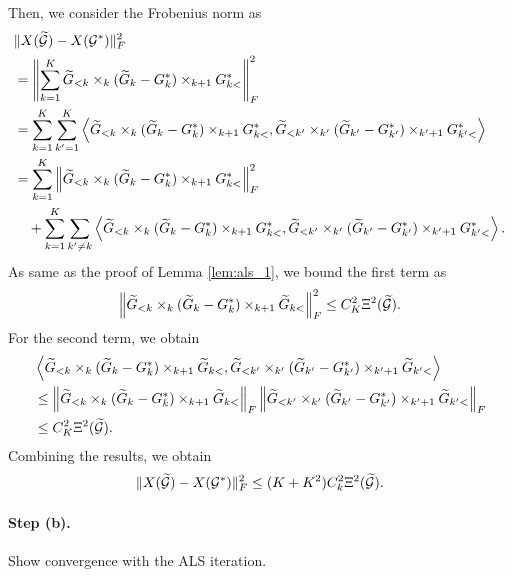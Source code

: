 Then, we consider the Frobenius norm as
\begin{align*}
	&\|X(\widetilde{\mathcal{G}}) - X(\mathcal{G}^*)\|_F^2 \\
	&= \left\| \sum_{k=1}^{K}  \widetilde G_{<k} \times_{k} (\widetilde G_{k} -  G_{k}^*) \times_{k+1}   G_{k<}^* \right\|_F^2 \\
	&= \sum_{k=1}^{K} \sum_{k'=1}^{K} \left\langle  \widetilde G_{<k} \times_{k} (\widetilde G_{k} -  G_{k}^*) \times_{k+1}   G_{k<}^*,  \widetilde G_{<k'} \times_{k'} (\widetilde G_{k'} -  G_{k'}^*) \times_{k'+1}   G_{k'<}^* \right\rangle \\
	&= \sum_{k=1}^K  \left\|   \widetilde G_{<k} \times_{k} (\widetilde G_{k} -  G_{k}^*) \times_{k+1}   G_{k<}^* \right\|_F^2 \\
	&\quad + \sum_{k=1}^{K} \sum_{k'\neq k} \left\langle  \widetilde G_{<k} \times_{k} (\widetilde G_{k} -  G_{k}^*) \times_{k+1}   G_{k<}^*,  \widetilde G_{<k'} \times_{k'} (\widetilde G_{k'} -  G_{k'}^*) \times_{k'+1}   G_{k'<}^* \right\rangle.
\end{align*}
As same as the proof of Lemma \ref{lem:als_1}, we bound the first term as
\begin{align*}
	\left\|   \widetilde G_{<k} \times_{k} (\widetilde G_{k} -  G_{k}^*) \times_{k+1}  \widetilde G_{k<} \right\|_F^2 \leq C_K^2\Xi^2(\widetilde{\mathcal{G}}).
\end{align*}
For the second term, we obtain
\begin{align*}
	&\left \langle  \widetilde G_{<k} \times_{k} (\widetilde G_{k} -  G_{k}^*) \times_{k+1}  \widetilde G_{k<},  \widetilde G_{<k'} \times_{k'} (\widetilde G_{k'} -  G_{k'}^*) \times_{k'+1}  \widetilde G_{k'<} \right\rangle \\
	&\leq \left\| \widetilde G_{<k} \times_{k} (\widetilde G_{k} -  G_{k}^*) \times_{k+1}  \widetilde G_{k<}\right\|_F \left\| \widetilde G_{<k'} \times_{k'} (\widetilde G_{k'} -  G_{k'}^*) \times_{k'+1}  \widetilde G_{k'<} \right\|_F \\
	&\leq  C_K^2\Xi^2(\widetilde{\mathcal{G}}).
\end{align*}
Combining the results, we obtain 
\begin{align*}
	\|X(\widetilde{\mathcal{G}}) - X(\mathcal{G}^*)\|_F^2 \leq (K+K^2)C_k^2 \Xi^2(\widetilde{\mathcal{G}}).
\end{align*}

\paragraph{Step (b).} Show convergence with the ALS iteration.

